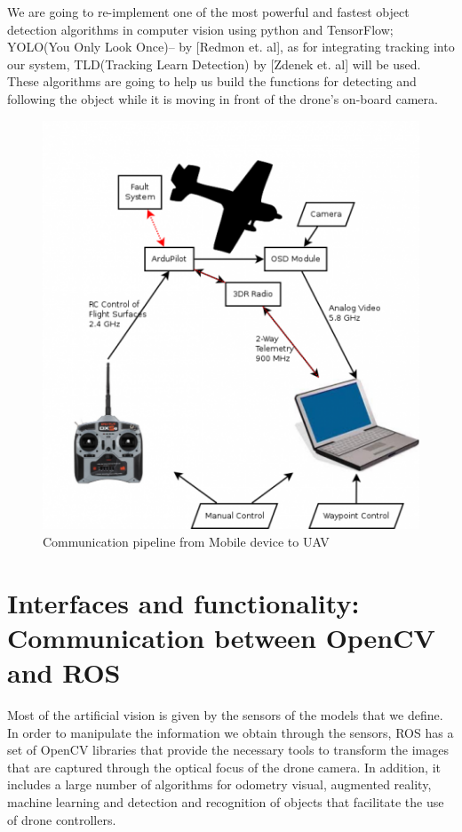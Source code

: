 We are going to re-implement one of the most powerful and fastest object detection algorithms in computer vision using python and TensorFlow; YOLO(You Only Look Once)-- by [Redmon et. al], as for integrating tracking into our system, TLD(Tracking Learn Detection) by [Zdenek et. al] will be used. These algorithms are going to help us build the functions for detecting and following the object while it is moving in front of the drone's on-board camera.

\begin{figure}[h]
\centering
\includegraphics[scale=0.9]{figures/base_station_architecture_ardupilot.png}
\caption{Communication pipeline from Mobile device to UAV}
\label{base_station_architecture_ardupilot}
\end{figure}


\section{Interfaces and functionality: Communication between OpenCV and ROS}

Most of the artificial vision is given by the sensors of the models that we define. In order to manipulate the information we obtain through the sensors, ROS has a set of OpenCV libraries that provide the necessary tools to transform the images that are captured through the optical focus of the drone camera. In addition, it includes a large number of algorithms for odometry visual, augmented reality, machine learning and detection and recognition of objects that facilitate the use of drone controllers.

